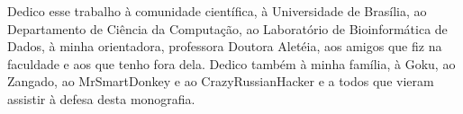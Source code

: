 Dedico esse trabalho à comunidade científica, à Universidade de Brasília, ao Departamento de Ciência da Computação, ao Laboratório de Bioinformática de Dados, à minha orientadora, professora Doutora Aletéia, aos amigos que fiz na faculdade e aos que tenho fora dela. Dedico também à minha família, à Goku, ao Zangado, ao MrSmartDonkey e ao CrazyRussianHacker e a todos que vieram assistir à defesa desta monografia.